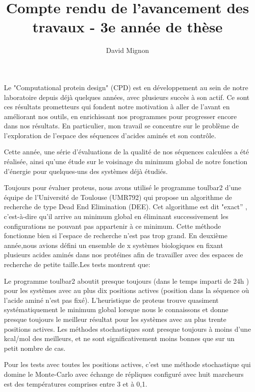 \documentclass[a4paper,11pt]{article}
\title{Compte rendu de l'avancement des travaux - 3e année de thèse}
\author{David Mignon}
\begin{document}
\maketitle


\begin{spacing}{1.0}

  Le "Computational protein design" (CPD) est en développement au sein de notre laboratoire depuis déjà quelques années, avec plusieurs succès à son actif.
  Ce sont ces résultats prometteurs qui fondent notre motivation à aller de l'avant en améliorant nos outils, en enrichissant 
  nos programmes pour progresser encore dans nos résultats. En particulier, mon travail se concentre sur le problème de l'exploration de l'espace des séquences d'acides aminés et son contrôle.

  Cette année, une série d'évaluations de la qualité de nos séquences calculées a été réalisée, ainsi qu'une étude sur le voisinage du minimum global de notre fonction d'énergie pour quelques-uns des systèmes déjà étudiés.

  Toujours pour évaluer proteus, nous avons utilisé le programme toulbar2 d'une équipe de l'Université de Toulouse (UMR792) qui propose un algorithme de recherche de type Dead End Elimination (DEE). Cet algorithme est dit "exact'' , c'est-à-dire qu'il arrive au minimum global en éliminant successivement les configurations ne pouvant pas appartenir à ce minimum. Cette méthode fonctionne bien si l'espace de recherche  n'est pas trop grand. En deuxième année,nous avions défini un ensemble de x systèmes biologiques en fixant plusieurs acides aminés dans nos protéines afin de travailler avec des espaces de recherche de petite taille.Les tests montrent que:

Le programme toulbar2 aboutit presque toujours (dans le temps imparti de 24h ) pour les systèmes avec au plus dix positions actives (position dans la séquence où l'acide aminé n'est pas fixé).
L'heuristique de proteus trouve quasiment systématiquement le minimum global lorsque nous le connaissons et donne presque toujours le meilleur résultat pour les systèmes avec au plus trente positions actives.
Les méthodes stochastiques sont presque toujours à moins d'une kcal/mol des meilleurs, et ne sont significativement moins bonnes que sur un petit nombre de cas.

Pour les tests avec toutes les positions actives, c'est une méthode stochastique qui domine le Monte-Carlo avec échange de répliques configuré avec huit marcheurs est des températures comprises entre 3 et à 0,1.


\end{spacing}
\end{document}
